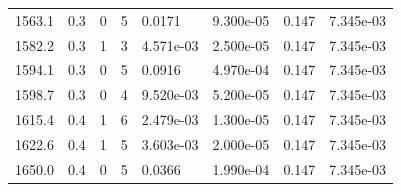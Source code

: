 \documentclass[preview]{standalone}
\begin{document}
{{{{{\begin{tabular}{L{1.2cm}C{1.2cm} C{0.3cm}C{0.5cm} C{1.4cm}C{1.4cm} C{1.4cm}C{1.4cm}}
  1563.1  &   0.3  & 0     &  5 &  0.0171  & 9.300e-05  & 0.147 &  7.345e-03   \\ 
  1582.2  &   0.3  & 1     &  3 &  4.571e-03  & 2.500e-05  & 0.147 &  7.345e-03   \\ 
  1594.1  &   0.3  & 0     &  5 &  0.0916  & 4.970e-04  & 0.147 &  7.345e-03   \\ 
  1598.7  &   0.3  & 0     &  4 &  9.520e-03  & 5.200e-05  & 0.147 &  7.345e-03   \\ 
  1615.4  &   0.4  & 1     &  6 &  2.479e-03  & 1.300e-05  & 0.147 &  7.345e-03   \\ 
  1622.6  &   0.4  & 1     &  5 &  3.603e-03  & 2.000e-05  & 0.147 &  7.345e-03   \\ 
  1650.0  &   0.4  & 0     &  5 &  0.0366  & 1.990e-04  & 0.147 &  7.345e-03   \\ 
\hline 
\end{tabular} 

}}}}}
\end{document}
